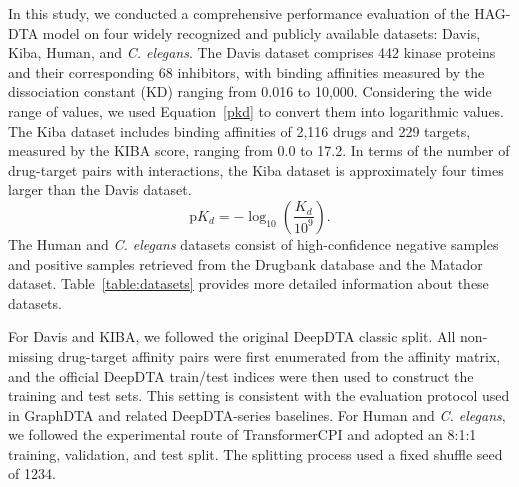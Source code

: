 \documentclass[pdflatex,sn-mathphys-num]{sn-jnl}%
\theoremstyle{thmstyleone}%
\theoremstyle{thmstyletwo}%
\theoremstyle{thmstylethree}%
\begin{document}
In this study, we conducted a comprehensive performance evaluation of the HAG-DTA model on four widely recognized and publicly available datasets: Davis\cite{davis2011comprehensive}, Kiba\cite{tang2014making}, Human\cite{liu2015improving}, and \textit{C. elegans}\cite{liu2015improving}.
\newline
\hspace*{1em}The Davis dataset comprises 442 kinase proteins and their corresponding 68 inhibitors, with binding affinities measured by the dissociation constant (KD) ranging from 0.016 to 10,000. Considering the wide range of values, we used Equation~\ref{pkd} to convert them into logarithmic values.
The Kiba dataset includes binding affinities of 2,116 drugs and 229 targets, measured by the KIBA score, ranging from 0.0 to 17.2. In terms of the number of drug-target pairs with interactions, the Kiba dataset is approximately four times larger than the Davis dataset.
\begin{equation}
\mathrm{p}K_d=-\log_{10}\left(\frac{K_d}{10^9}\right).
\label{pkd}
\end{equation}
\newline
\hspace*{1em}
The Human and \textit{C. elegans} datasets consist of high-confidence negative samples and positive samples retrieved from the Drugbank database and the Matador dataset. Table~\ref{table:datasets} provides more detailed information about these datasets.

\begin{table}[htbp]
\centering
\caption{Summary of the four datasets.}
\label{table:datasets}
\end{table}


For Davis and KIBA, we followed the original DeepDTA classic split. All non-missing drug-target affinity pairs were first enumerated from the affinity matrix, and the official DeepDTA train/test indices were then used to construct the training and test sets. This setting is consistent with the evaluation protocol used in GraphDTA and related DeepDTA-series baselines. For Human and \textit{C. elegans}, we followed the experimental route of TransformerCPI and adopted an 8:1:1 training, validation, and test split. The splitting process used a fixed shuffle seed of 1234. 
\end{document}

